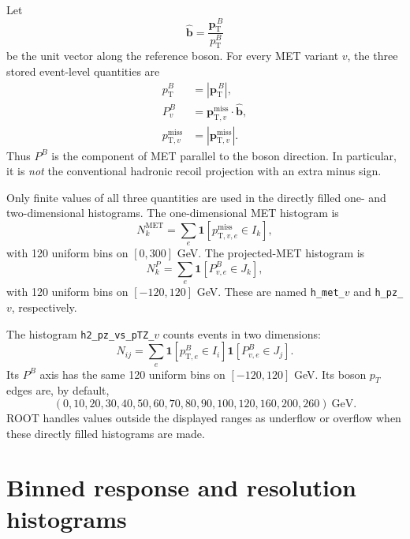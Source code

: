 \documentclass[11pt,a4paper]{article}
\newcommand{\vpt}{\boldsymbol{p}_{\mathrm{T}}}
\newcommand{\vmet}[1]{\boldsymbol{p}_{\mathrm{T},#1}^{\mathrm{miss}}}
\begin{document}
Let
\begin{equation}
  \widehat{\boldsymbol{b}}
  =\frac{\vpt^{\,B}}{p_{\mathrm{T}}^B}
\end{equation}
be the unit vector along the reference boson.  For every MET variant $v$, the
three stored event-level quantities are
\begin{align}
  p_{\mathrm{T}}^B &= |\vpt^{\,B}|,\\
  P^B_v &= \vmet{v}\mathbin{\cdot}\widehat{\boldsymbol{b}},
  \label{eq:projection}\\
  p_{\mathrm{T},v}^{\mathrm{miss}} &= |\vmet{v}|.
\end{align}
Thus $P^B$ is the component of MET parallel to the boson direction.  In
particular, it is \emph{not} the conventional hadronic recoil projection with
an extra minus sign.

Only finite values of all three quantities are used in the directly filled
one- and two-dimensional histograms.  The one-dimensional MET histogram is
\begin{equation}
  N_k^{\mathrm{MET}}
  =\sum_e \mathbf{1}\!\left[
    p_{\mathrm{T},v,e}^{\mathrm{miss}}\in I_k\right],
\end{equation}
with 120 uniform bins on $[0,300]$ GeV.  The projected-MET histogram is
\begin{equation}
  N_k^{P}
  =\sum_e \mathbf{1}\!\left[P^B_{v,e}\in J_k\right],
\end{equation}
with 120 uniform bins on $[-120,120]$ GeV.  These are named
\texttt{h\_met\_\(v\)} and \texttt{h\_pz\_\(v\)}, respectively.

The histogram \texttt{h2\_pz\_vs\_pTZ\_\(v\)} counts events in two
dimensions:
\begin{equation}
  N_{ij}=\sum_e \mathbf{1}\!\left[p_{\mathrm{T},e}^{B}\in I_i\right]
                    \mathbf{1}\!\left[P^B_{v,e}\in J_j\right].
\end{equation}
Its $P^B$ axis has the same 120 uniform bins on $[-120,120]$ GeV.  Its boson
$p_T$ edges are, by default,
\begin{equation}
  (0,10,20,30,40,50,60,70,80,90,100,120,160,200,260)~\mathrm{GeV}.
  \label{eq:pt-bins}
\end{equation}
ROOT handles values outside the displayed ranges as underflow or overflow
when these directly filled histograms are made.

\section{Binned response and resolution histograms}
\end{document}
